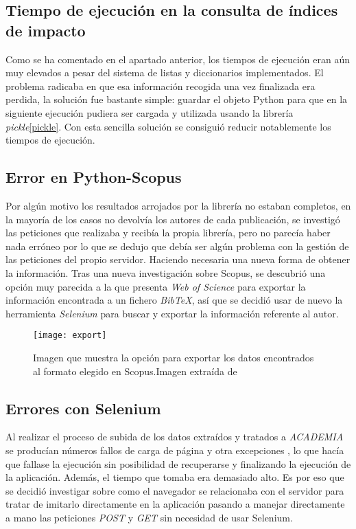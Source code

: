 \subsection{Tiempo de ejecución en la consulta de índices de impacto}
Como se ha comentado en el apartado anterior, los tiempos de ejecución eran aún muy elevados a pesar del sistema de listas y diccionarios implementados. El problema radicaba en que esa información recogida una vez finalizada era perdida, la solución fue bastante simple: guardar el objeto Python para que en la siguiente ejecución pudiera ser cargada y utilizada usando la librería \emph{pickle}\ref{pickle}.
Con esta sencilla solución se consiguió reducir notablemente los tiempos de ejecución.
\subsection{Error en Python-Scopus}
Por algún motivo los resultados arrojados por la librería no estaban completos, en la mayoría de los casos no devolvía los autores de cada publicación, se investigó las peticiones que realizaba y recibía la propia librería, pero no parecía haber nada erróneo por lo que se dedujo que debía ser algún problema con la gestión de las peticiones del propio servidor. Haciendo necesaria una nueva forma de obtener la información.
	Tras una nueva investigación sobre Scopus, se descubrió una opción muy parecida a la que presenta \emph{Web of Science} para exportar la información encontrada a un fichero \emph{BibTeX}, así que se decidió usar de nuevo la herramienta \emph{Selenium} para buscar y exportar la información referente al autor.
\begin{figure}[H]
	\centering
	\texttt{[image: export]}
	\caption{Imagen que muestra la opción para exportar los datos encontrados al formato elegido en Scopus.Imagen extraída de \cite{scopus}}
	\label{fig:export}
\end{figure}
\subsection{Errores con Selenium}
Al realizar el proceso de subida de los datos extraídos y tratados a \emph{ACADEMIA} se producían números fallos de carga de página y otra excepciones , lo que hacía que fallase la ejecución sin posibilidad de recuperarse y finalizando la ejecución de la aplicación. Además, el tiempo que tomaba era demasiado alto. Es por eso que se decidió investigar sobre como el navegador se relacionaba con el servidor para tratar de imitarlo directamente en la aplicación pasando a manejar directamente a mano las peticiones \emph{POST} y \emph{GET} sin necesidad de usar Selenium.

